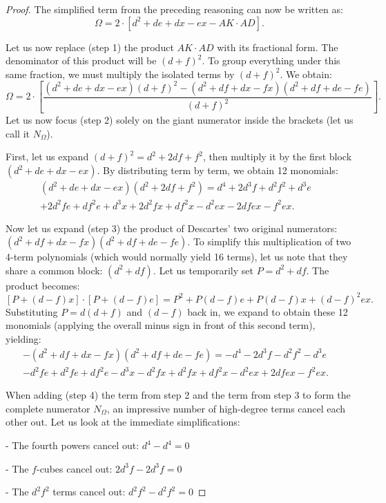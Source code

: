 \documentclass[12pt]{article}
\theoremstyle{définition}
\theoremstyle{remark}
\theoremstyle{plain}
\theoremstyle{plain}
\begin{document}
\begin{proof}
The simplified term from the preceding reasoning can now be written as:
\[
\Omega =2\cdot \left[d^{2}+de+dx-ex-AK\cdot AD\right].
\]

Let us now replace (step 1) the product \(AK \cdot AD\) with its fractional form. The denominator of this product will be \((d+f)^2\). To group everything under this same fraction, we must multiply the isolated terms by \((d+f)^2\). We obtain:
\[
\Omega =2\cdot \left[\frac{(d^{2}+de+dx-ex)(d+f)^{2}-(d^{2}+df+dx-fx)(d^{2}+df+de-fe)}{(d+f)^{2}}\right].
\]
Let us now focus (step 2) solely on the giant numerator inside the brackets (let us call it \(N_{\Omega }\)). 

First, let us expand \((d+f)^2 = d^2 + 2df + f^2\), then multiply it by the first block \((d^2 + de + dx - ex)\). By distributing term by term, we obtain 12 monomials:
\begin{align*}
(d^{2}+de+dx-ex)(d^{2}+2df+f^{2})= d^{4}+2d^{3}f+d^{2}f^{2}+d^{3}e & \\
+ 2d^{2}fe+df^{2}e+d^{3}x+2d^{2}fx +df^{2}x-d^{2}ex-2dfex-f^{2}ex.
\end{align*}

Now let us expand (step 3) the product of Descartes' two original numerators: \((d^2 + df + dx - fx)(d^2 + df + de - fe)\). To simplify this multiplication of two 4-term polynomials (which would normally yield 16 terms), let us note that they share a common block: \((d^2 + df)\). Let us temporarily set \(P = d^2 + df\). The product becomes:
\[
[P+(d-f)x]\cdot [P+(d-f)e]=P^{2}+P(d-f)e+P(d-f)x+(d-f)^{2}ex.
\]
Substituting \(P = d(d+f)\) and \((d-f)\) back in, we expand to obtain these 12 monomials (applying the overall minus sign in front of this second term), yielding:
\begin{align*}
-(d^{2}+df+dx-fx)(d^{2}+df+de-fe)= -d^{4}-2d^{3}f-d^{2}f^{2}-d^{3}e & \\-d^{2}fe+d^{2}fe+df^{2}e
-d^{3}x-d^{2}fx+d^{2}fx+df^{2}x-d^{2}ex+2dfex-f^{2}ex.
\end{align*}

When adding (step 4) the term from step 2 and the term from step 3 to form the complete numerator \(N_{\Omega }\), an impressive number of high-degree terms cancel each other out. Let us look at the immediate simplifications:

- The fourth powers cancel out: \(d^4 - d^4 = 0\)

- The \(f\)-cubes cancel out: \(2d^3f - 2d^3f = 0\)

- The \(d^{2}f^{2}\) terms cancel out: \(d^2f^2 - d^2f^2 = 0\)


\end{proof}
\end{document}
